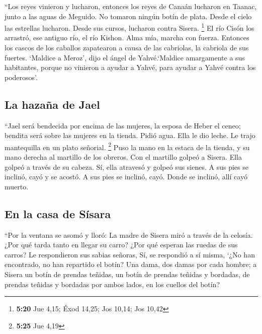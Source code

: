 \begin{paracol}{2}
 ``Los reyes vinieron y lucharon, entonces los reyes de
Canaán lucharon en Taanac, junto a las aguas de Meguido. No tomaron
ningún botín de plata.  Desde el cielo las estrellas
lucharon. Desde sus cursos, lucharon contra Sisera. \footnote{\textbf{5:20}
  Jue 4,15; Éxod 14,25; Jos 10,14; Jos 10,42}  El río
Cisón los arrastró, ese antiguo río, el río Kishon. Alma mía, marcha con
fuerza.  Entonces los cascos de los caballos zapatearon a
causa de las cabriolas, la cabriola de sus fuertes. 
`Maldice a Meroz', dijo el ángel de Yahvé.`Maldice amargamente a sus
habitantes, porque no vinieron a ayudar a Yahvé, para ayudar a Yahvé
contra los poderosos'.

\hypertarget{la-hazauxf1a-de-jael}{%
\subsection{La hazaña de Jael}\label{la-hazauxf1a-de-jael}}

 ``Jael será bendecida por encima de las mujeres, la
esposa de Heber el ceneo; bendita será sobre las mujeres en la tienda.
 Pidió agua. Ella le dio leche. Le trajo mantequilla en
un plato señorial. \footnote{\textbf{5:25} Jue 4,19} 
Puso la mano en la estaca de la tienda, y su mano derecha al martillo de
los obreros. Con el martillo golpeó a Sisera. Ella golpeó a través de su
cabeza. Sí, ella atravesó y golpeó sus sienes.  A sus
pies se inclinó, cayó y se acostó. A sus pies se inclinó, cayó. Donde se
inclinó, allí cayó muerto.

\hypertarget{en-la-casa-de-suxedsara}{%
\subsection{En la casa de Sísara}\label{en-la-casa-de-suxedsara}}

 ``Por la ventana se asomó y lloró: La madre de Sisera
miró a través de la celosía. ¿Por qué tarda tanto en llegar su carro?
¿Por qué esperan las ruedas de sus carros?  Le
respondieron sus sabias señoras, Sí, se respondió a sí misma,
 `¿No han encontrado, no han repartido el botín? Una
dama, dos damas por cada hombre; a Sisera un botín de prendas teñidas,
un botín de prendas teñidas y bordadas, de prendas teñidas y bordadas
por ambos lados, en los cuellos del botín?

\hypertarget{el-canto-del-cisne}{%
}
\end{paracol}
